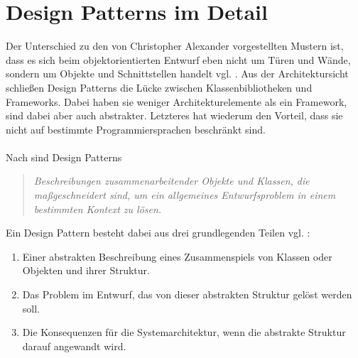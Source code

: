 \documentclass[fontsize=11pt,a4paper,final]{scrreprt}[2003/01/01]
\begin{document}
\chapter{Design Patterns im Detail}\label{se:Design Patterns im Detail}
Der Unterschied zu den von Christopher Alexander vorgestellten Mustern ist, dass es sich beim objektorientierten Entwurf eben nicht um Türen und Wände, sondern um Objekte und Schnittstellen handelt vgl. \cite[S. 3]{gamma2004}.
Aus der Architektursicht schließen Design Patterns die Lücke zwischen Klassenbibliotheken und Frameworks. Dabei haben sie weniger Architekturelemente als ein Framework, sind dabei aber auch abstrakter. Letzteres hat wiederum den Vorteil, dass sie nicht auf bestimmte Programmiersprachen beschränkt sind. \\ \\
Nach \cite[S. 4]{gamma2004} sind Design Patterns 

\begin{quote}
	\textit{\glqq Beschreibungen zusammenarbeitender Objekte und Klassen, die maßgeschneidert sind, um ein allgemeines Entwurfsproblem in einem bestimmten Kontext zu lösen\grqq.}
\end{quote} 
\smallskip
Ein Design Pattern besteht dabei aus drei grundlegenden Teilen vgl. \cite{Gamma1993}:
\begin{enumerate}
	\item Einer abstrakten Beschreibung eines Zusammenspiels von Klassen oder Objekten und ihrer Struktur.
	\item Das Problem im Entwurf, das von dieser abstrakten Struktur gelöst werden soll.
	\item Die Konsequenzen für die Systemarchitektur, wenn die abstrakte Struktur darauf angewandt wird.
\end{enumerate}	
\end{document}
